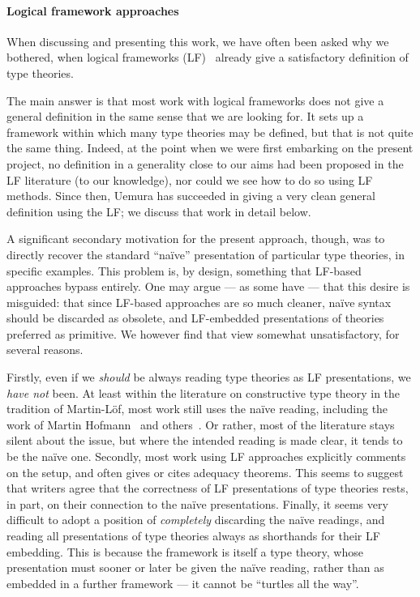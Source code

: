 \paragraph*{Logical framework approaches}

When discussing and presenting this work, we have often been asked why we bothered, when logical frameworks (LF)~\citep{harper-honsell-plotkin:framework,pfenning:logical-frameworks} already give a satisfactory definition of type theories.

The main answer is that most work with logical frameworks does not give a general definition in the same sense that we are looking for.
%
It sets up a framework within which many type theories may be defined, but that is not quite the same thing.
%
Indeed, at the point when we were first embarking on the present project, no definition in a generality close to our aims had been proposed in the LF literature (to our knowledge), nor could we see how to do so using LF methods.
%
Since then, Uemura has succeeded in giving a very clean general definition using the LF; we discuss that work in detail below.

A significant secondary motivation for the present approach, though, was to directly recover the standard “naïve” presentation of particular type theories, in specific examples.
%
This problem is, by design, something that LF-based approaches bypass entirely.
%
One may argue --- as some have --- that this desire is misguided: that since LF-based approaches are so much cleaner, naïve syntax should be discarded as obsolete, and LF-embedded presentations of theories preferred as primitive.
%
We however find that view somewhat unsatisfactory, for several reasons.

Firstly, even if we \emph{should} be always reading type theories as LF presentations, we \emph{have not} been.  At least within the literature on constructive type theory in the tradition of Martin-Löf, most work still uses the naïve reading, including the work of Martin Hofmann~\citep{hofmann:syntax-and-semantics} and others~\citep{martin-lof:introduction,streicher91:_seman,hott-book}.
%
Or rather, most of the literature stays silent about the issue, but where the intended reading is made clear, it tends to be the naïve one.
%
Secondly, most work using LF approaches explicitly comments on the setup, and often gives or cites adequacy theorems.
%
This seems to suggest that writers agree that the correctness of LF presentations of type theories rests, in part, on their connection to the naïve presentations.
%
Finally, it seems very difficult to adopt a position of \emph{completely} discarding the naïve readings, and reading all presentations of type theories always as shorthands for their LF embedding.
%
This is because the framework is itself a type theory, whose presentation must sooner or later be given the naïve reading, rather than as embedded in a further framework --- it cannot be “turtles all the way”.

